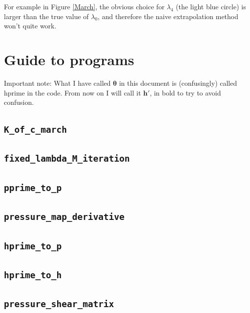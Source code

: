 \documentclass{article}
\newcommand{\bs}{\boldsymbol}                               %
\begin{document}
For example in Figure \ref{March}, the obvious choice for $\lambda_4$
(the light blue circle) is larger than the true value of $\lambda_0$, 
and therefore the naive extrapolation method won't quite work.
\clearpage
\section*{Guide to programs}
Important note: What I have called $\bs{\theta}$ in this document is
(confusingly) called hprime in the code. From now on I will call it
$\bs{h}'$, in bold to try to avoid confusion.
\subsection*{\color{blue} \texttt{K\_of\_c\_march}}

\subsection*{\color{blue} \texttt{fixed\_lambda\_M\_iteration}}

\subsection*{\color{blue} \texttt{pprime\_to\_p}}

\subsection*{\color{blue} \texttt{pressure\_map\_derivative}}

\subsection*{\color{blue} \texttt{hprime\_to\_p}}

\subsection*{\color{blue} \texttt{hprime\_to\_h}}

\subsection*{\color{blue} \texttt{pressure\_shear\_matrix}}

\end{document}
